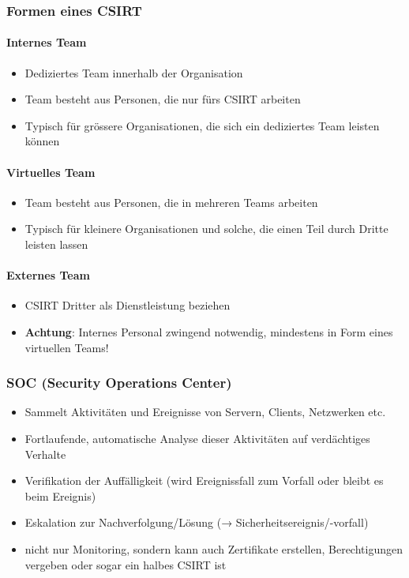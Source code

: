 \subsubsection{Formen eines CSIRT}
\paragraph{Internes Team}
\begin{itemize}
    \item Dediziertes Team innerhalb der Organisation
    \item Team besteht aus Personen, die nur fürs CSIRT arbeiten
    \item Typisch für grössere Organisationen, die sich ein dediziertes Team leisten können
\end{itemize}

\paragraph{Virtuelles Team}
\begin{itemize}
    \item Team besteht aus Personen, die in mehreren Teams arbeiten
    \item Typisch für kleinere Organisationen und solche, die einen Teil durch Dritte leisten lassen
\end{itemize}

\paragraph{Externes Team}
\begin{itemize}
    \item CSIRT Dritter als Dienstleistung beziehen
    \item \textbf{Achtung}: Internes Personal zwingend notwendig, mindestens in Form eines virtuellen Teams!
\end{itemize}

\subsubsection{SOC (Security Operations Center)}
\begin{itemize}
    \item Sammelt Aktivitäten und Ereignisse von Servern, Clients, Netzwerken etc.
    \item Fortlaufende, automatische Analyse dieser Aktivitäten auf verdächtiges Verhalte
    \item Verifikation der Auffälligkeit (wird Ereignissfall zum Vorfall oder bleibt es beim Ereignis)
    \item Eskalation zur Nachverfolgung/Lösung (→ Sicherheitsereignis/-vorfall)
    \item nicht nur Monitoring, sondern kann auch Zertifikate erstellen, Berechtigungen vergeben oder sogar ein \glqq halbes CSIRT\grqq{} ist
\end{itemize}

